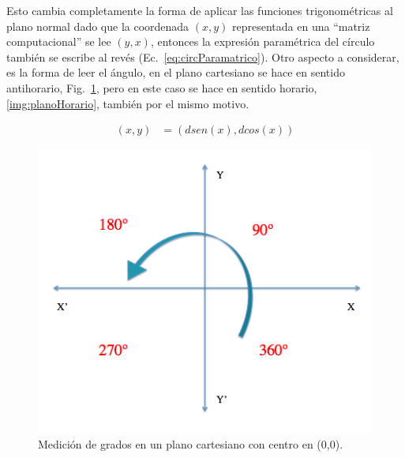 Esto cambia completamente la forma de aplicar las funciones
trigonométricas al plano normal dado que la coordenada $(x,y)$
representada en una ``matriz computacional'' se lee $(y,x)$, entonces
la expresión paramétrica del círculo también se escribe al revés
(Ec.~\ref{eq:circParamatrico}). Otro aspecto a considerar, es la forma
de leer el ángulo, en el plano cartesiano se hace en sentido
antihorario, Fig.~\ref{img:planoCartesiano}, pero en este caso se hace
en sentido horario, \ref{img:planoHorario}, también por el mismo motivo.

\begin{align}
  (x,y) & = (dsen(x), dcos(x)) \label{eq:circParamatrico}
\end{align}

\begin{figure}[hb!]
  \begin{center}
    \includegraphics[scale=.5]{image/planoCartesiano}
  \end{center}
  \caption{Medición de grados en un plano cartesiano con centro en (0,0).}\label{img:planoCartesiano}
\end{figure}

